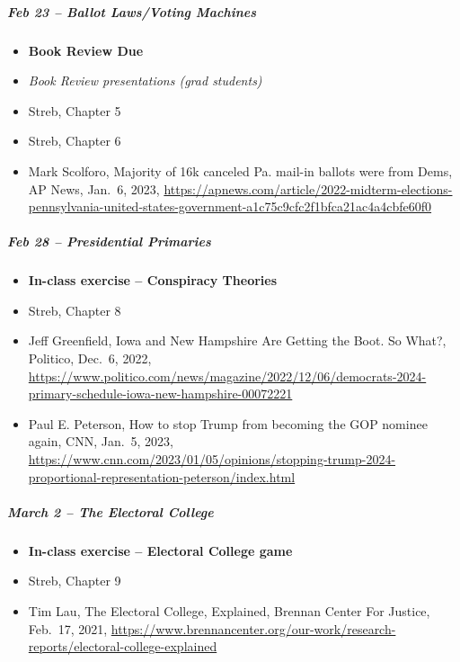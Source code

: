 \documentclass[
]{article}
\providecommand{\tightlist}{%
  \setlength{\itemsep}{0pt}\setlength{\parskip}{0pt}}
\begin{document}
\hypertarget{feb-23-ballot-lawsvoting-machines}{%
\subparagraph{Feb 23 -- Ballot Laws/Voting
Machines}\label{feb-23-ballot-lawsvoting-machines}}

\begin{itemize}
\tightlist
\item
  \textbf{Book Review Due}
\item
  \emph{Book Review presentations (grad students)}
\item
  Streb, Chapter 5
\item
  Streb, Chapter 6
\item
  Mark Scolforo, Majority of 16k canceled Pa. mail-in ballots were from
  Dems, AP News, Jan.~6, 2023,
  \url{https://apnews.com/article/2022-midterm-elections-pennsylvania-united-states-government-a1c75c9cfc2f1bfca21ac4a4cbfe60f0}
\end{itemize}

\hypertarget{feb-28-presidential-primaries}{%
\subparagraph{Feb 28 -- Presidential
Primaries}\label{feb-28-presidential-primaries}}

\begin{itemize}
\tightlist
\item
  \textbf{In-class exercise -- Conspiracy Theories}
\item
  Streb, Chapter 8
\item
  Jeff Greenfield, Iowa and New Hampshire Are Getting the Boot. So
  What?, Politico, Dec.~6, 2022,
  \url{https://www.politico.com/news/magazine/2022/12/06/democrats-2024-primary-schedule-iowa-new-hampshire-00072221}
\item
  Paul E. Peterson, How to stop Trump from becoming the GOP nominee
  again, CNN, Jan.~5, 2023,
  \url{https://www.cnn.com/2023/01/05/opinions/stopping-trump-2024-proportional-representation-peterson/index.html}
\end{itemize}

\hypertarget{march-2-the-electoral-college}{%
\subparagraph{March 2 -- The Electoral
College}\label{march-2-the-electoral-college}}

\begin{itemize}
\tightlist
\item
  \textbf{In-class exercise -- Electoral College game}
\item
  Streb, Chapter 9
\item
  Tim Lau, The Electoral College, Explained, Brennan Center For Justice,
  Feb.~17, 2021,
  \url{https://www.brennancenter.org/our-work/research-reports/electoral-college-explained}
\end{itemize}
\end{document}
